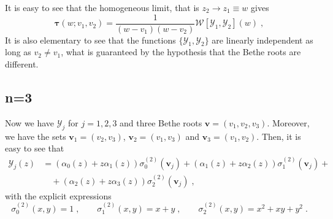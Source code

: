 \documentclass[a4paper,12pt]{amsart}
\begin{document}
It is easy to see that the homogeneous limit, that is \(z_2 \to z_1\equiv
w\) gives
\begin{equation}
  \bm{\tau}(w; v_1 , v_2) =
  \frac{1}{(w- v_1)(w- v_2)}\mathcal{W}[\mathcal{Y}_1, \mathcal{Y}_2](w)\; , 
\end{equation}
It is also elementary to see that the functions \(\{\mathcal{Y}_1,
\mathcal{Y}_2\}\) are linearly independent as long as \(v_2 \neq
v_1\), what is guaranteed by the hypothesis that the Bethe roots are
different.


\subsection{n=3} Now we have \(\mathcal{Y}_j\) for \(j=1,2,3\) and three Bethe roots
\(\bm{v} = (v_1, v_2, v_3)\). Moreover, we have the sets \(\bm{v}_1 = (v_2, v_3)\), \(\bm{v}_2 = (v_1, v_3)\)
and \(\bm{v}_3 = (v_1, v_2)\). Then, it is easy to see that
\begin{equation}
\begin{split}
  \mathcal{Y}_j(z)
  & = (\alpha_0(z) + z \alpha_1(z))\sigma_0^{(2)}(\bm{v}_j)   + (\alpha_1(z) + z \alpha_2(z))\sigma_1^{(2)}(\bm{v}_j)  + \\
  & \quad + (\alpha_2(z) + z \alpha_3(z))\sigma_2^{(2)}(\bm{v}_j) \; ,
\end{split}
\end{equation}
with the explicit expressions 
\begin{equation}
  \sigma_0^{(2)}(x, y) = 1\; ,\qquad 
  \sigma_1^{(2)}(x, y) = x + y\; ,\qquad 
  \sigma_2^{(2)}(x, y) = x^2 + xy  + y^2\; . 
\end{equation}
\end{document}
